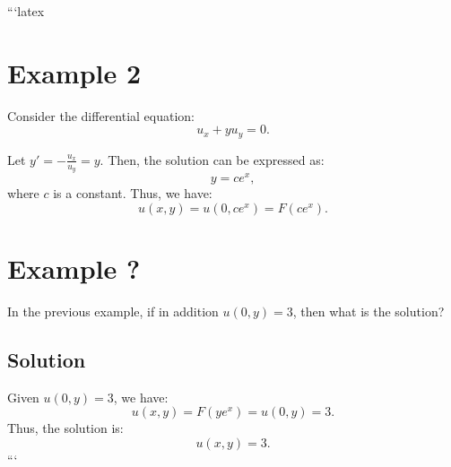 ```latex
\section*{Example 2}

Consider the differential equation:
\begin{equation}
    u_x + y u_y = 0.
\end{equation}

Let \( y' = - \frac{u_x}{u_y} = y \). Then, the solution can be expressed as:
\begin{equation}
    y = ce^{x},
\end{equation}
where \( c \) is a constant. Thus, we have:
\begin{equation}
    u(x, y) = u(0, ce^{x}) = F(ce^{x}).
\end{equation}

\section*{Example ?}

In the previous example, if in addition \( u(0, y) = 3 \), then what is the solution?

\subsection*{Solution}

Given \( u(0, y) = 3 \), we have:
\begin{equation}
    u(x, y) = F(ye^{x}) = u(0, y) = 3.
\end{equation}
Thus, the solution is:
\begin{equation}
    u(x, y) = 3.
\end{equation}
```
